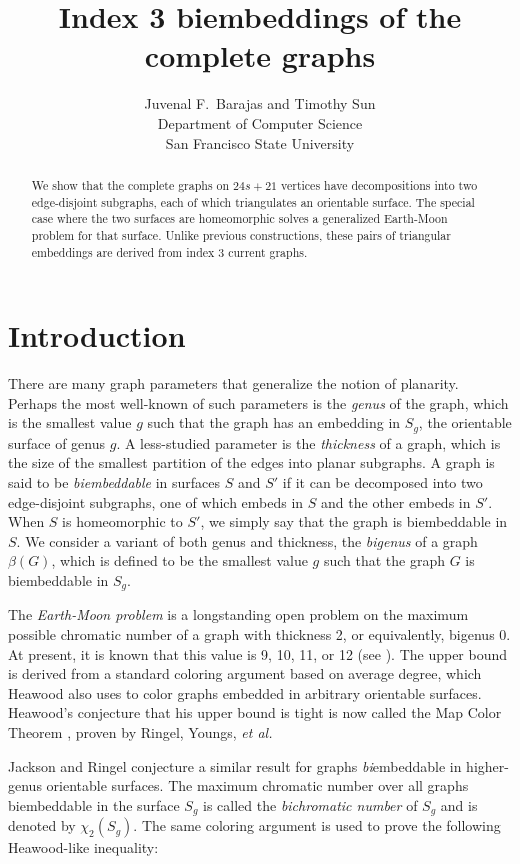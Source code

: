 \documentclass[12pt]{article}
\title{Index 3 biembeddings of the complete graphs}
\author{Juvenal F.\ Barajas and Timothy Sun\\Department of Computer Science\\San Francisco State University}
\date{}
\theoremstyle{plain}
\begin{document}
\maketitle

\begin{abstract}
We show that the complete graphs on $24s+21$ vertices have decompositions into two edge-disjoint subgraphs, each of which triangulates an orientable surface. The special case where the two surfaces are homeomorphic solves a generalized Earth-Moon problem for that surface. Unlike previous constructions, these pairs of triangular embeddings are derived from index 3 current graphs.
\end{abstract}

\section{Introduction}

There are many graph parameters that generalize the notion of planarity. Perhaps the most well-known of such parameters is the \emph{genus} of the graph, which is the smallest value $g$ such that the graph has an embedding in $S_g$, the orientable surface of genus $g$. A less-studied parameter is the \emph{thickness} of a graph, which is the size of the smallest partition of the edges into planar subgraphs. A graph is said to be \emph{biembeddable} in surfaces $S$ and $S'$ if it can be decomposed into two edge-disjoint subgraphs, one of which embeds in $S$ and the other embeds in $S'$. When $S$ is homeomorphic to $S'$, we simply say that the graph is biembeddable in $S$. We consider a variant of both genus and thickness, the \emph{bigenus} of a graph $\beta(G)$, which is defined to be the smallest value $g$ such that the graph $G$ is biembeddable in $S_g$.

The \emph{Earth-Moon problem} is a longstanding open problem on the maximum possible chromatic number of a graph with thickness 2, or equivalently, bigenus 0. At present, it is known that this value is 9, 10, 11, or 12 (see \cite{Gethner-ToTheMoon}). The upper bound is derived from a standard coloring argument based on average degree, which Heawood \cite{Heawood-MapColour} also uses to color graphs embedded in arbitrary orientable surfaces. Heawood's conjecture that his upper bound is tight is now called the Map Color Theorem \cite{Ringel-MapColor}, proven by Ringel, Youngs, \emph{et al.} 

Jackson and Ringel \cite{JacksonRingel-Variations} conjecture a similar result for graphs \emph{bi}embeddable in higher-genus orientable surfaces. The maximum chromatic number over all graphs biembeddable in the surface $S_g$ is called the \emph{bichromatic number} of $S_g$ and is denoted by $\chi_2(S_g)$. The same coloring argument is used to prove the following Heawood-like inequality:
\end{document}

